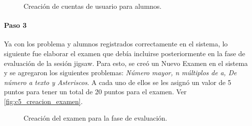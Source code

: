 \begin{figure}
	\centering
	\caption{Creación de cuentas de usuario para alumnos.}
	\label{fig:c5_creacion_alumnos}
\end{figure}

\paragraph{Paso 3}
Ya con los problema y alumnos registrados correctamente en el sistema, lo siguiente fue elaborar el examen que debía incluirse posteriormente en la fase de evaluación de la sesión jigsaw. Para esto, se creó un Nuevo Examen en el sistema y se agregaron los siguientes problemas: \emph{Número mayor, n múltiplos de a, De número a texto y Asteriscos}. A cada uno de ellos se les asignó un valor de 5 puntos para tener un total de 20 puntos para el examen. Ver \autoref{fig:c5_creacion_examen}.

\begin{figure}
	\centering
	\caption{Creación del examen para la fase de evaluación.}
	\label{fig:c5_creacion_examen}
\end{figure}

